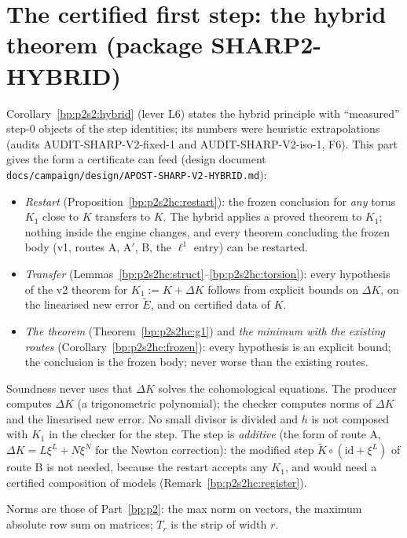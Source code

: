 \section{The certified first step: the hybrid theorem (package SHARP2-HYBRID)}\label{bp:p2s2hc}

Corollary~\ref{bp:p2s2:hybrid} (lever L6) states the hybrid principle with ``measured'' step-$0$ objects of the step identities; its numbers were
heuristic extrapolations (audits AUDIT-SHARP-V2-fixed-1 and AUDIT-SHARP-V2-iso-1, F6). This part gives the form a certificate can feed
(design document \texttt{docs/campaign/design/APOST-SHARP-V2-HYBRID.md}):
\begin{itemize}
\item \emph{Restart} (Proposition~\ref{bp:p2s2hc:restart}): the frozen conclusion for \emph{any} torus $K_1$ close to $K$ transfers to $K$. The hybrid
  applies a proved theorem to $K_1$; nothing inside the engine changes, and every theorem concluding the frozen body (v1, routes A, A$'$, B,
  the $\ell^1$ entry) can be restarted.
\item \emph{Transfer} (Lemmas~\ref{bp:p2s2hc:struct}--\ref{bp:p2s2hc:torsion}): every hypothesis of the v2 theorem for $K_1:=K+\Delta K$ follows from
  explicit bounds on $\Delta K$, on the linearised new error $\tilde E$, and on certified data of $K$.
\item \emph{The theorem} (Theorem~\ref{bp:p2s2hc:g1}) and \emph{the minimum with the existing routes} (Corollary~\ref{bp:p2s2hc:frozen}): every
  hypothesis is an explicit bound; the conclusion is the frozen body; never worse than the existing routes.
\end{itemize}
Soundness never uses that $\Delta K$ solves the cohomological equations. The producer computes $\Delta K$ (a trigonometric polynomial); the
checker computes norms of $\Delta K$ and the linearised new error. No small divisor is divided and $h$ is not composed with $K_1$ in the checker
for the step. The step is \emph{additive} (the form of route A, $\Delta K=L\xi^L+N\xi^N$ for the Newton correction): the modified step
$\tilde K\circ(\mathrm{id}+\xi^L)$ of route B is not needed, because the restart accepts any $K_1$, and would need a certified composition of models
(Remark~\ref{bp:p2s2hc:register}).

Norms are those of Part~\ref{bp:p2}: the max norm on vectors, the maximum absolute row sum on matrices; $T_r$ is the strip of width $r$.


